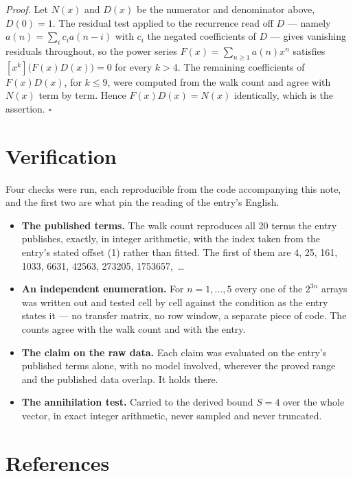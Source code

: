 \documentclass[11pt]{article}
\theoremstyle{definition}
\begin{document}
{\itshape Proof.} Let $N(x)$ and $D(x)$ be the numerator and denominator above, $D(0)=1$. The residual test applied to the recurrence read off $D$ --- namely $a(n) = \sum_i c_i a(n-i)$ with $c_i$ the negated coefficients of $D$ --- gives vanishing residuals throughout, so the power series $F(x)=\sum_{n\ge 1}a(n)x^n$ satisfies $[x^k]\bigl(F(x)D(x)\bigr) = 0$ for every $k > 4$. The remaining coefficients of $F(x)D(x)$, for $k \le 9$, were computed from the walk count and agree with $N(x)$ term by term. Hence $F(x)D(x) = N(x)$ identically, which is the assertion. $\square$

\section{Verification}

Four checks were run, each reproducible from the code accompanying this note, and the first two are what pin the reading of the entry's English.

\begin{itemize}

\item {\bfseries The published terms.} The walk count reproduces all 20 terms the entry publishes, exactly, in integer arithmetic, with the index taken from the entry's stated offset (1) rather than fitted. The first of them are 4, 25, 161, 1033, 6631, 42563, 273205, 1753657,~\dots

\item {\bfseries An independent enumeration.} For $n = 1,\dots,5$ every one of the $2^{3n}$ arrays was written out and tested cell by cell against the condition as the entry states it --- no transfer matrix, no row window, a separate piece of code. The counts agree with the walk count and with the entry.

\item {\bfseries The claim on the raw data.} Each claim was evaluated on the entry's published terms alone, with no model involved, wherever the proved range and the published data overlap. It holds there.

\item {\bfseries The annihilation test.} Carried to the derived bound $S = 4$ over the whole vector, in exact integer arithmetic, never sampled and never truncated.

\end{itemize}

\section{References}
\end{document}
